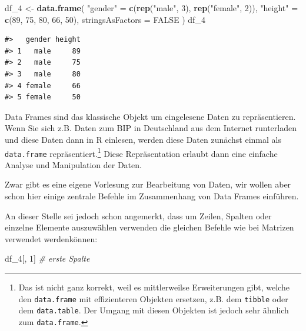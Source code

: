 \documentclass[]{book}
\newenvironment{Shaded}{\begin{snugshade}}{\end{snugshade}}
\newcommand{\KeywordTok}[1]{\textcolor[rgb]{0.13,0.29,0.53}{\textbf{#1}}}
\newcommand{\DataTypeTok}[1]{\textcolor[rgb]{0.13,0.29,0.53}{#1}}
\newcommand{\DecValTok}[1]{\textcolor[rgb]{0.00,0.00,0.81}{#1}}
\newcommand{\StringTok}[1]{\textcolor[rgb]{0.31,0.60,0.02}{#1}}
\newcommand{\CommentTok}[1]{\textcolor[rgb]{0.56,0.35,0.01}{\textit{#1}}}
\newcommand{\OtherTok}[1]{\textcolor[rgb]{0.56,0.35,0.01}{#1}}
\newcommand{\NormalTok}[1]{#1}
\let\rmarkdownfootnote\footnote%
\def\footnote{\protect\rmarkdownfootnote}
\begin{document}
\begin{Shaded}
\begin{Highlighting}[]
\NormalTok{df_}\DecValTok{4}\NormalTok{ <-}\StringTok{ }\KeywordTok{data.frame}\NormalTok{(}
  \StringTok{"gender"}\NormalTok{ =}\StringTok{ }\KeywordTok{c}\NormalTok{(}\KeywordTok{rep}\NormalTok{(}\StringTok{"male"}\NormalTok{, }\DecValTok{3}\NormalTok{), }\KeywordTok{rep}\NormalTok{(}\StringTok{"female"}\NormalTok{, }\DecValTok{2}\NormalTok{)),}
  \StringTok{"height"}\NormalTok{ =}\StringTok{ }\KeywordTok{c}\NormalTok{(}\DecValTok{89}\NormalTok{, }\DecValTok{75}\NormalTok{, }\DecValTok{80}\NormalTok{, }\DecValTok{66}\NormalTok{, }\DecValTok{50}\NormalTok{),}
  \DataTypeTok{stringsAsFactors =} \OtherTok{FALSE}
\NormalTok{)}
\NormalTok{df_}\DecValTok{4}
\end{Highlighting}
\end{Shaded}

\begin{verbatim}
#>   gender height
#> 1   male     89
#> 2   male     75
#> 3   male     80
#> 4 female     66
#> 5 female     50
\end{verbatim}

Data Frames sind das klassische Objekt um eingelesene Daten zu
repräsentieren. Wenn Sie sich z.B. Daten zum BIP in Deutschland aus dem
Internet runterladen und diese Daten dann in R einlesen, werden diese
Daten zunächst einmal als \texttt{data.frame} repräsentiert.\footnote{Das
  ist nicht ganz korrekt, weil es mittlerweilse Erweiterungen gibt,
  welche den \texttt{data.frame} mit effizienteren Objekten ersetzen,
  z.B. dem \texttt{tibble} oder dem \texttt{data.table}. Der Umgang mit
  diesen Objekten ist jedoch sehr ähnlich zum \texttt{data.frame}.}
Diese Repräsentation erlaubt dann eine einfache Analyse und Manipulation
der Daten.

Zwar gibt es eine eigene Vorlesung zur Bearbeitung von Daten, wir wollen
aber schon hier einige zentrale Befehle im Zusammenhang von Data Frames
einführen.

An dieser Stelle sei jedoch schon angemerkt, dass um Zeilen, Spalten
oder einzelne Elemente auszuwählen verwenden die gleichen Befehle wie
bei Matrizen verwendet werdenkönnen:

\begin{Shaded}
\begin{Highlighting}[]
\NormalTok{df_}\DecValTok{4}\NormalTok{[, }\DecValTok{1}\NormalTok{] }\CommentTok{# erste Spalte}
\end{Highlighting}
\end{Shaded}
\end{document}
